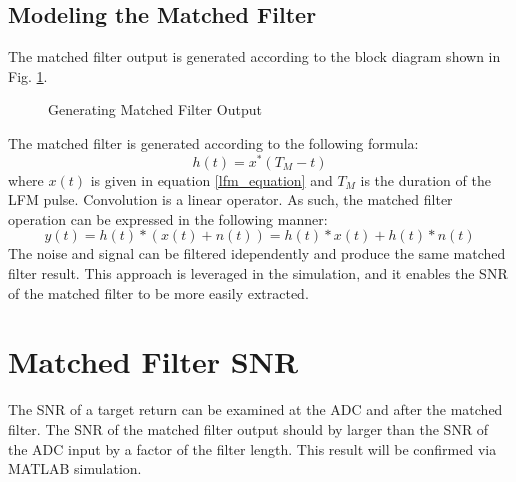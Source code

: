 \documentclass[12pt,letterpaper]{article}
\begin{document}
\subsection{Modeling the Matched Filter}
The matched filter output is generated according to the block diagram shown in Fig. \ref{Generate MF Output}.
\begin{figure}[H]
\caption{Generating Matched Filter Output}
\label{Generate MF Output}
\end{figure}
\noindent
The matched filter is generated according to the following formula:
\begin{equation}
h(t) = x^*(T_M - t)
\end{equation}
where $x(t)$ is given in equation \eqref{lfm_equation} and $T_M$ is the duration of the LFM pulse. Convolution is a linear operator. As such, the matched filter operation can be expressed in the following manner:
\begin{equation}
y(t) = h(t) * (x(t) + n(t)) = h(t)*x(t) + h(t)*n(t)
\end{equation}
The noise and signal can be filtered idependently and produce the same matched filter result. This approach is leveraged in the simulation, and it enables the SNR of the matched filter to be more easily extracted.
\section{Matched Filter SNR}
The SNR of a target return can be examined at the ADC and after the matched filter. The SNR of the matched filter output should by larger than the SNR of the ADC input by a factor of the filter length. This result will be confirmed via MATLAB simulation.
\end{document}
